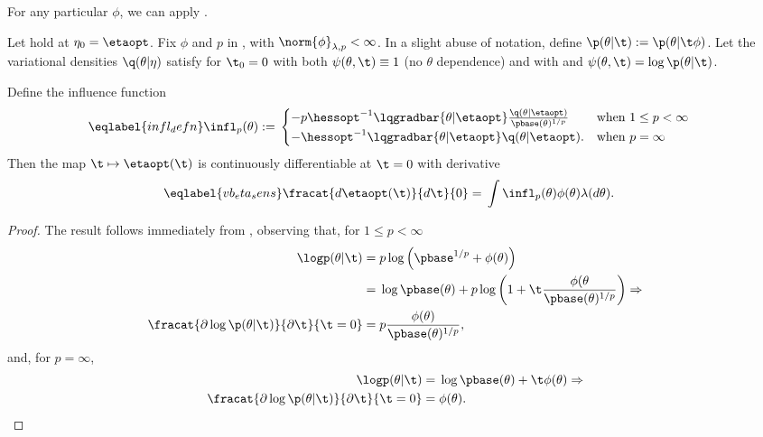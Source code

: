 For any particular $\phi$, we can apply .

\begin{cor}
%
Let  hold at $\eta_0 = \etaopt$.
%
Fix $\phi$ and $p$ in , with $\norm{\phi}_{\lambda,p} <
\infty$.  In a slight abuse of notation, define $\p(\theta \vert \t) :=
\p(\theta \vert \t \phi)$.  Let the variational densities $\q(\theta \vert
\eta)$ satisfy  for $\t_0 = 0$ with both $\psi(\theta,
\t) \equiv 1$ (no $\theta$ dependence) and with and $\psi(\theta, \t) = \log
\p(\theta \vert \t)$.

Define the influence function
%
\begin{align}\eqlabel{infl_defn}
%
\infl_p(\theta) :={}&
\begin{cases}
    - p \hessopt^{-1}
        \lqgradbar{\theta \vert \etaopt}
        \frac{\q(\theta \vert \etaopt)}{\pbase(\theta)^{1/p}}
& \textrm{when }1 \le p < \infty \\
%
    - \hessopt^{-1}
        \lqgradbar{\theta \vert \etaopt}
        \q(\theta \vert \etaopt).
& \textrm{when }p = \infty
%
\end{cases}
%
\end{align}
%
Then the map $\t \mapsto \etaopt(\t)$ is continuously differentiable at $\t=0$
with derivative
%
\begin{align}\eqlabel{vb_eta_sens}
%
\fracat{d \etaopt(\t)}{d \t}{0} ={}&
    \int \infl_p(\theta) \phi(\theta) \lambda(d\theta).
%
\end{align}
%
\begin{proof}
%
The result follows immediately from , observing that, for
$1 \le p < \infty$
%
\begin{align*}
%
\logp(\theta \vert \t) ={}&
    p \log\left(\pbase^{1/p} + \phi(\theta) \right)
\\={}&
    \log \pbase(\theta) + p \log\left(1 + \t \frac{\phi(\theta}{\pbase(\theta)^{1/p}}\right)
\Rightarrow\\
\fracat{\partial \log \p(\theta \vert \t)}{\partial \t}{\t=0} ={}&
    p \frac{\phi(\theta)}{\pbase(\theta)^{1/p}},
%
\end{align*}
%
and, for $p = \infty$,
%
\begin{align*}
%
\logp(\theta \vert \t) ={}&
    \log \pbase(\theta) + \t \phi(\theta)
\Rightarrow\\
\fracat{\partial \log \p(\theta \vert \t)}{\partial \t}{\t=0} ={}&
    \phi(\theta).
%
\end{align*}
%
\end{proof}
%
\end{cor}
